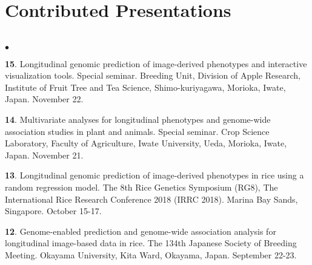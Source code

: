 \documentclass[margin,line,10pt]{res}
\newenvironment{list2}{
  \begin{list}{$\bullet$}{%
      \setlength{\itemsep}{0in}
      \setlength{\parsep}{0in} \setlength{\parskip}{0in}
      \setlength{\topsep}{0in} \setlength{\partopsep}{0in} 
      \setlength{\leftmargin}{0.2in}}}{\end{list}}
\begin{document}
\begin{resume}
\vspace{0.5cm}
\section{\sc Contributed Presentations}
\vspace{1.0cm}



\section{}
\begin{list2}

\item [{\bf 15}.] Longitudinal genomic prediction of image-derived phenotypes and interactive visualization tools. Special seminar. Breeding Unit, Division of Apple Research, Institute of Fruit Tree and Tea Science, Shimo-kuriyagawa, Morioka, Iwate, Japan. November 22.
  
  \vspace{0.5cm}
  
\item [{\bf 14}.] Multivariate analyses for longitudinal phenotypes and genome-wide association studies in plant and animals. Special seminar. Crop Science Laboratory, Faculty of Agriculture, Iwate University, Ueda, Morioka, Iwate, Japan. November 21.
  
  \vspace{0.5cm}

\item [{\bf 13}.] Longitudinal genomic prediction of image-derived phenotypes in rice using a random regression model. The 8th Rice Genetics Symposium (RG8), The International Rice Research Conference 2018 (IRRC 2018). Marina Bay Sands, Singapore. October 15-17.
  
  \vspace{0.5cm}
  
\item [{\bf 12}.] Genome-enabled prediction and genome-wide association analysis for longitudinal image-based data in rice. The 134th Japanese Society of Breeding Meeting. Okayama University, Kita Ward, Okayama, Japan. September 22-23.
  
  \vspace{0.5cm}


\end{list2}
\end{resume}
\end{document}
